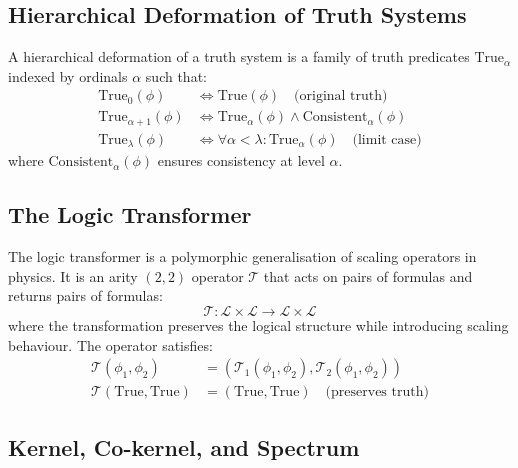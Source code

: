 \subsection{Hierarchical Deformation of Truth Systems}

\begin{definition}
\label{def:hierarchical-deformation}
A hierarchical deformation of a truth system is a family of truth predicates $\text{True}_\alpha$ indexed by ordinals $\alpha$ such that:
\begin{align}
\text{True}_0(\phi) &\Leftrightarrow \text{True}(\phi) \quad \text{(original truth)} \\
\text{True}_{\alpha+1}(\phi) &\Leftrightarrow \text{True}_\alpha(\phi) \land \text{Consistent}_\alpha(\phi) \\
\text{True}_\lambda(\phi) &\Leftrightarrow \forall \alpha < \lambda: \text{True}_\alpha(\phi) \quad \text{(limit case)}
\end{align}
where $\text{Consistent}_\alpha(\phi)$ ensures consistency at level $\alpha$.
\end{definition}

\subsection{The Logic Transformer}

\begin{definition}
\label{def:logic-transformer}
The logic transformer is a polymorphic generalisation of scaling operators in physics. It is an arity $(2,2)$ operator $\mathcal{T}$ that acts on pairs of formulas and returns pairs of formulas:
\[
\mathcal{T}: \mathcal{L} \times \mathcal{L} \to \mathcal{L} \times \mathcal{L}
\]
where the transformation preserves the logical structure while introducing scaling behaviour. The operator satisfies:
\begin{align}
\mathcal{T}(\phi_1, \phi_2) &= (\mathcal{T}_1(\phi_1, \phi_2), \mathcal{T}_2(\phi_1, \phi_2)) \\
\mathcal{T}(\text{True}, \text{True}) &= (\text{True}, \text{True}) \quad \text{(preserves truth)}
\end{align}
\end{definition}

\subsection{Kernel, Co-kernel, and Spectrum}

